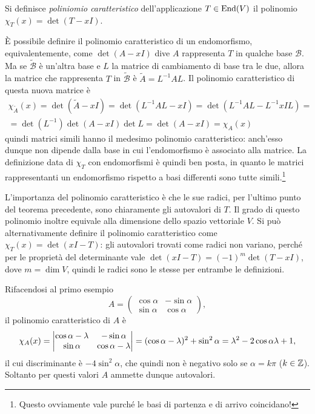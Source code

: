 \begin{definizione} \label{d:polinomio-caratteristico}
	Si definisce \emph{poliniomio caratteristico} dell'applicazione $T\in\operatorname{End}(V)$ il polinomio $\chi_T(x)=\det(T-xI)$.
\end{definizione}
È possibile definire il polinomio caratteristico di un endomorfismo, equivalentemente, come $\det(A-xI)$ dive $A$ rappresenta $T$ in qualche base $\mathcal B$.
Ma se $\tilde{\mathcal B}$ è un'altra base e $L$ la matrice di cambiamento di base tra le due, allora la matrice che rappresenta $T$ in $\tilde{\mathcal B}$ è $\tilde{A}=L^{-1}AL$.
Il polinomio caratteristico di questa nuova matrice è
\begin{multline}
	\chi_{\tilde{A}}(x)=\det(\tilde{A}-xI)=\det(L^{-1}AL-xI)=\det(L^{-1}AL-L^{-1}xIL)=\\=
	\det(L^{-1})\det(A-xI)\det L=\det(A-xI)=\chi_A(x)
\end{multline}
quindi matrici simili hanno il medesimo polinomio caratteristico: anch'esso dunque non dipende dalla base in cui l'endomorfismo è associato alla matrice.
La definizione data di $\chi_T$ con endomorfismi è quindi ben posta, in quanto le matrici rappresentanti un endomorfismo rispetto a basi differenti sono tutte simili.\footnote{Questo ovviamente vale purch\'e le basi di partenza e di arrivo coincidano!}

L'importanza del polinomio caratteristico è che le sue radici, per l'ultimo punto del teorema precedente, sono chiaramente gli autovalori di $T$.
Il grado di questo polinomio inoltre equivale alla dimensione dello spazio vettoriale $V$.
Si può alternativamente definire il polinomio caratteristico come $\chi_T(x)=\det(xI-T)$: gli autovalori trovati come radici non variano, perché per le proprietà del determinante vale $\det(xI-T)=(-1)^m\det(T-xI)$, dove $m=\dim V$, quindi le radici sono le stesse per entrambe le definizioni.

Rifacendosi al primo esempio
\begin{equation*}
	A=\begin{pmatrix}\cos\alpha&-\sin\alpha\\\sin\alpha&\cos\alpha\end{pmatrix},
\end{equation*}
il polinomio caratteristico di $A$ è
\begin{equation*}
		\chi_A(x)=\begin{vmatrix}\cos\alpha-\lambda&-\sin\alpha\\\sin\alpha&\cos\alpha-\lambda\end{vmatrix}=\\
		(\cos\alpha-\lambda)^2+\sin^2\alpha=\\
		\lambda^2-2\cos\alpha\lambda+1,
\end{equation*}
il cui discriminante è $-4\sin^2\alpha$, che quindi non è negativo solo se $\alpha=k\pi$ ($k\in\mathbb{Z}$).
Soltanto per questi valori $A$ ammette dunque autovalori.

